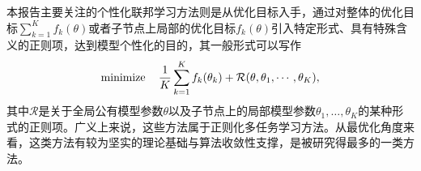 本报告主要关注的个性化联邦学习方法则是从优化目标入手，通过对整体的优化目标$\sum\limits_{k=1}^K f_k(\theta)$或者子节点上局部的优化目标$f_k(\theta)$引入特定形式、具有特殊含义的正则项，达到模型个性化的目的\cite{hanzely2020federated,t2020pfedme,deng2020_apfl,dinh2021fedu,li2021pfedmac,li_2021_ditto,acar2021feddyn}，其一般形式可以写作
\begin{equation}
\label{eq:pfl-general}
\operatorname*{minimize} \quad \frac{1}{K}\sum\limits_{k=1}^K f_k(\theta_k) + \mathcal{R}(\theta, \theta_1, \cdots, \theta_K),
\end{equation}
其中$\mathcal{R}$是关于全局公有模型参数$\theta$以及子节点上的局部模型参数$\theta_1, \ldots, \theta_K$的某种形式的正则项。广义上来说，这些方法属于正则化多任务学习方法\cite{Caruana_1997_mtl, evgeniou2004regularized}。从最优化角度来看，这类方法有较为坚实的理论基础与算法收敛性支撑，是被研究得最多的一类方法。
